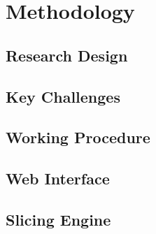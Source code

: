 \chapter{Methodology}

\section{Research Design} 
\section{Key Challenges} 
\section{Working Procedure} 
\section{Web Interface} 
\section{Slicing Engine} 